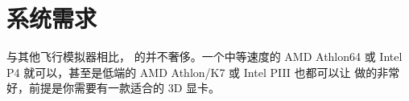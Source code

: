 \ifchinese
\section{系统需求}
\fi

\ifchinese
与其他飞行模拟器相比，\FlightGear{} 的并不奢侈。一个中等速度的 AMD Athlon64 或 Intel
P4 就可以，甚至是低端的 AMD Athlon/K7 或 Intel PIII 也都可以让 \FlightGear{} 做的非常好，前提是你需要有一款适合的 3D 显卡。

